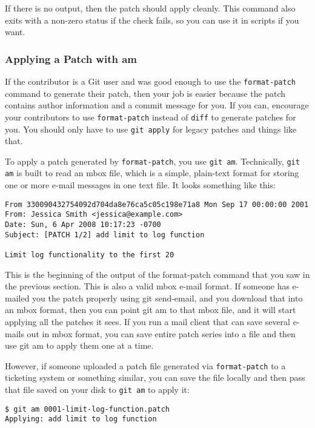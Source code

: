 \documentclass[a4paper]{book}
\begin{document}
If there is no output, then the patch should apply cleanly. This command also exits with a non-zero status if the check fails, so you can use it in scripts if you want.

\subsubsection{Applying a Patch with am}

If the contributor is a Git user and was good enough to use the \texttt{format-patch} command to generate their patch, then your job is easier because the patch contains author information and a commit message for you. If you can, encourage your contributors to use \texttt{format-patch} instead of \texttt{diff} to generate patches for you. You should only have to use \texttt{git apply} for legacy patches and things like that.

To apply a patch generated by \texttt{format-patch}, you use \texttt{git am}. Technically, \texttt{git am} is built to read an mbox file, which is a simple, plain-text format for storing one or more e-mail messages in one text file. It looks something like this:

\begin{shaded}\begin{verbatim}
From 330090432754092d704da8e76ca5c05c198e71a8 Mon Sep 17 00:00:00 2001
From: Jessica Smith <jessica@example.com>
Date: Sun, 6 Apr 2008 10:17:23 -0700
Subject: [PATCH 1/2] add limit to log function

Limit log functionality to the first 20
\end{verbatim}\end{shaded}

This is the beginning of the output of the format-patch command that you saw in the previous section. This is also a valid mbox e-mail format. If someone has e-mailed you the patch properly using git send-email, and you download that into an mbox format, then you can point git am to that mbox file, and it will start applying all the patches it sees. If you run a mail client that can save several e-mails out in mbox format, you can save entire patch series into a file and then use git am to apply them one at a time.

However, if someone uploaded a patch file generated via \texttt{format-patch} to a ticketing system or something similar, you can save the file locally and then pass that file saved on your disk to \texttt{git am} to apply it:

\begin{shaded}\begin{verbatim}
$ git am 0001-limit-log-function.patch
Applying: add limit to log function
\end{verbatim}\end{shaded}
\end{document}
